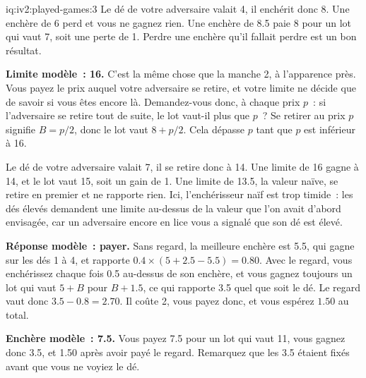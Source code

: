 \begin{solution}{iq:iv2:played-games:3}
Le dé de votre adversaire valait 4, il enchérit donc 8. Une enchère de 6 perd et vous ne gagnez rien. Une enchère de 8.5 paie 8 pour un lot qui vaut 7, soit une perte de 1. Perdre une enchère qu'il fallait perdre est un bon résultat.

\ivstop

\textbf{Limite modèle~: 16.} C'est la même chose que la manche 2, à l'apparence près. Vous payez le prix auquel votre adversaire se retire, et votre limite ne décide que de savoir si vous êtes encore là. Demandez-vous donc, à chaque prix $p$~: si l'adversaire se retire tout de suite, le lot vaut-il plus que $p$~? Se retirer au prix $p$ signifie $B = p/2$, donc le lot vaut $8 + p/2$. Cela dépasse $p$ tant que $p$ est inférieur à 16.

Le dé de votre adversaire valait 7, il se retire donc à 14. Une limite de 16 gagne à 14, et le lot vaut 15, soit un gain de 1. Une limite de 13.5, la valeur naïve, se retire en premier et ne rapporte rien. Ici, l'enchérisseur naïf est trop timide~: les dés élevés demandent une limite au-dessus de la valeur que l'on avait d'abord envisagée, car un adversaire encore en lice vous a signalé que son dé est élevé.

\ivstop
\textbf{Réponse modèle~: payer.} Sans regard, la meilleure enchère est 5.5, qui gagne sur les dés 1 à 4, et rapporte $0.4 \times (5 + 2.5 - 5.5) = 0.80$. Avec le regard, vous enchérissez chaque fois 0.5 au-dessus de son enchère, et vous gagnez toujours un lot qui vaut $5 + B$ pour $B + 1.5$, ce qui rapporte 3.5 quel que soit le dé. Le regard vaut donc $3.5 - 0.8 = 2.70$. Il coûte 2, vous payez donc, et vous espérez $1.50$ au total.

\ivstop
\textbf{Enchère modèle~: 7.5.} Vous payez 7.5 pour un lot qui vaut 11, vous gagnez donc 3.5, et 1.50 après avoir payé le regard. Remarquez que les 3.5 étaient fixés avant que vous ne voyiez le dé.


\end{solution}
